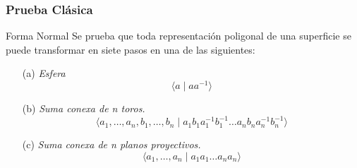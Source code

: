 \documentclass{beamer}
\theoremstyle{definition}
\begin{document}
\begin{frame}
\frametitle{Prueba Clásica}
\begin{block}{Forma Normal}
Se prueba que toda representación poligonal de una superficie se puede transformar en siete pasos en una de las siguientes:
\begin{itemize}
\item [(a)] \textit{Esfera} 
$$\langle a \mid aa^{-1} \rangle$$
\item[(b)] \textit{Suma conexa de n toros.}
$$\langle a_1,\dots ,a_n, b_1,\dots ,b_n\mid a_1b_1a_1^{-1}b_1^{-1}\dots a_nb_na_n^{-1}b_n^{-1}\rangle$$ 
\item[(c)] \textit{Suma conexa de n planos proyectivos.} 
$$\langle a_1,\dots ,a_n\mid a_1a_1\dots a_na_n\rangle$$
\end{itemize}
\end{block}

\end{frame}
\end{document}
